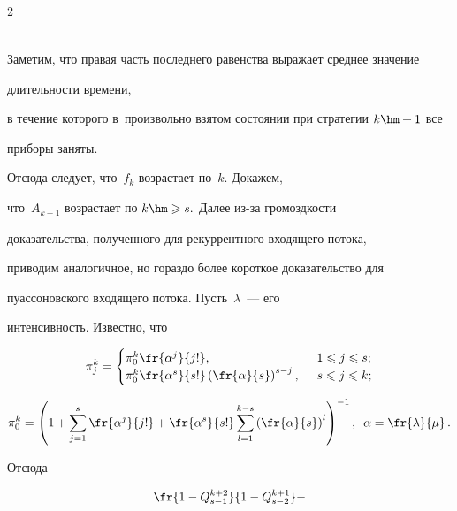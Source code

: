 \begin{multicols}{2}
{\begin{multline*}
\end{multline*}


Заметим, что правая часть последнего равенства выражает среднее значение 


длительности времени,


в течение которого в~произвольно взятом состоянии при стратегии $k\hm+1$ все 


приборы заняты.





Отсюда следует, что~$f_k$ возрастает по~$k.$ Докажем, 


что~$A_{k+1}$ возрастает по $k\hm\geqslant s.$ Далее из-за громоздкости


доказательства, полученного для рекуррентного входящего потока,


приводим аналогичное, но гораздо более короткое доказательство для


пуассоновского входящего потока. Пусть~$\lambda$~--- его


интенсивность. Известно, что


\begin{equation*}


\pi_j^k=


\begin{cases}


\pi_0^k \fr{\alpha^j}{j!}, &\enskip 1\leqslant j\leqslant s;\\


\pi_0^k\fr{\alpha^s}{s!}\left(\fr{\alpha}{s}\right)^{s-j},&\enskip


s\leqslant j\leqslant k;


\end{cases}


\end{equation*}


\begin{equation*}


\pi_0^k=\left(1+\sum\limits_{j=1}^s \fr{\alpha^j}{j!}+


\fr{\alpha^s}{s!} \sum\limits_{l=1}^{k-s}\left(\fr{\alpha}{s}\right)^{l}\right)^{-1},\enskip


\alpha=\fr{\lambda}{\mu}\,.


\end{equation*}


Отсюда


\begin{multline}


\fr{1-Q_{s-1}^{k+2}}{1-Q_{s-2}^{k+1}}-



\end{multline}}
\end{multicols}
